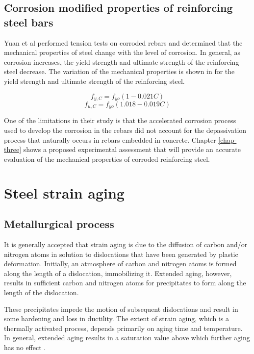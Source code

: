 \subsection{Corrosion modified properties of reinforcing steel bars}

Yuan et al \cite{Yuan2017a} performed tension tests on corroded rebars and determined that the mechanical properties of steel change with the level of corrosion. In general, as corrosion increases, the yield strength and ultimate strength of the reinforcing steel decrease.  The variation of the mechanical properties is shown in  for the yield strength and ultimate strength of the reinforcing steel.

\begin{equation}
  f_{y,C}=f_{yo}(1-0.021C)
  \label{eq.eleven}
\end{equation} 
\[
  f_{u,C}=f_{yo}(1.018-0.019C)
\]

One of the limitations in their study is that the accelerated corrosion process used to develop the corrosion in the rebars did not account for the depassivation process that naturally occurs in rebars embedded in concrete. Chapter \ref{chap-three} shows a proposed experimental assessment that will provide an accurate evaluation of the mechanical properties of corroded reinforcing steel. 

\section{Steel strain aging}

\subsection{Metallurgical process}

It is generally accepted that strain aging is due to the diffusion of carbon and/or nitrogen atoms in solution to dislocations that have been generated by plastic deformation. Initially, an atmosphere of carbon and nitrogen atoms is formed along the length of a dislocation, immobilizing it. Extended aging, however, results in sufficient carbon and nitrogen atoms for precipitates to form along the length of the dislocation\cite{Overby2017}\cite{Hosseini2015}.

These precipitates impede the motion of subsequent dislocations and result in some hardening and loss in ductility. The extent of strain aging, which is a thermally activated process, depends primarily on aging time and temperature. In general, extended aging results in a saturation value above which further aging has no effect \cite{Restrepo-Posada1994}.

